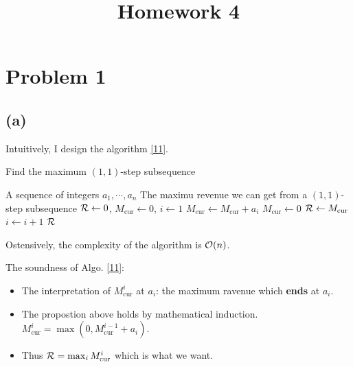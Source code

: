 \documentclass{article}
\begin{document}
\title{Homework 4}
\maketitle

\section*{Problem 1}
\subsection*{(a)}
Intuitively, I design the algorithm \ref{11}.
\begin{algorithm}[htbp]
	\caption{Find the maximum $(1,1)$-step subsequence}
	\label{11}
	\begin{algorithmic}[1]
		\renewcommand{\algorithmicrequire}{\textbf{Input:}}
		\renewcommand{\algorithmicensure}{\textbf{Output:}}
		\renewcommand{\algorithmiccomment}[1]{\hfill\textit{\textcolor{blue}{\##1}}}
		\REQUIRE A sequence of integers $a_1,\cdots,a_n$
		\ENSURE The maximu revenue we can get from a $(1,1)$-step subsequence
		\STATE $\mathcal{R}\gets 0$, $M_{\mathrm{cur}}\gets 0$, $i\gets 1$
		\STATE $M_{\mathrm{cur}}\gets M_{\mathrm{cur}}+a_i$
		\STATE $M_{\mathrm{cur}}\gets 0$
		\ENDIF
		\STATE $\mathcal{R}\gets M_{\mathrm{cur}}$
		\ENDIF
		\STATE $i\gets i+1$
		\ENDWHILE
		\RETURN $\mathcal{R}$
	\end{algorithmic}
\end{algorithm}
Ostensively, the complexity of the algorithm is $\mathcal{O}(n)$.

The soundness of Algo. \ref{11}:
\begin{itemize}
	\item 
		The interpretation of $M_{\mathrm{cur}}^i$ at $a_i$: the maximum ravenue which \textbf{ends} at $a_i$. 
	\item
		The propostion above holds by mathematical induction. $M_{\mathrm{cur}}^i=\max(0,M_{\mathrm{cur}}^{i-1}+a_i)$.
	\item
		Thus $\mathcal{R}=\max_iM_{\mathrm{cur}}^i$ which is what we want.
\end{itemize}
\end{document}
